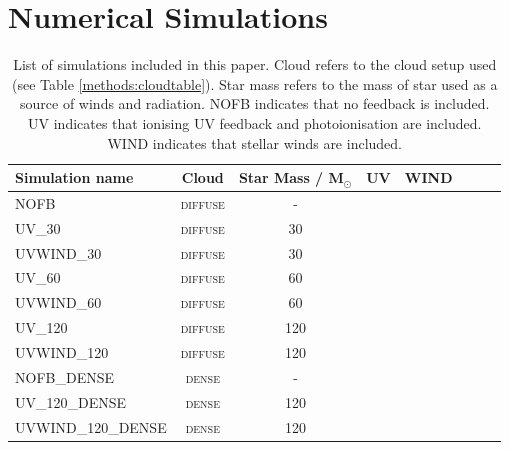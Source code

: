 \documentclass[a4paper,fleqn,usenatbib]{mnras}
\newcommand{\Msolar}{M$_{\odot}$\xspace}
\newcommand{\tick}{\hspace{1pt}\ding{51}}
\newcommand{\cross}{\hspace{1pt}\ding{55}}
\begin{document}
\section{Numerical Simulations}
\label{methods}

\begin{table}
	\centering
	\caption{List of simulations included in this paper. Cloud refers to the cloud setup used (see Table \ref{methods:cloudtable}). Star mass refers to the mass of star used as a source of winds and radiation. NOFB indicates that no feedback is included. UV indicates that ionising UV feedback and photoionisation are included. WIND indicates that stellar winds are included.}
	\label{methods:simtable}
	\begin{tabular}{lccccccc} %
		\hline
		Simulation name     & Cloud             & Star Mass / \Msolar & UV     & WIND \\
		\hline
		\hline
		NOFB                & \textsc{diffuse}  & -                   & \cross & \cross \\
		\hline
		UV\_30              & \textsc{diffuse}  & 30                  & \tick  & \cross \\
		UVWIND\_30          & \textsc{diffuse}  & 30                  & \tick  & \tick  \\
		\hline
		UV\_60              & \textsc{diffuse}  & 60                  & \tick  & \cross \\
		UVWIND\_60          & \textsc{diffuse}  & 60                  & \tick  & \tick  \\
		\hline
		UV\_120             & \textsc{diffuse}  & 120                 & \tick  & \cross \\
		UVWIND\_120         & \textsc{diffuse}  & 120                 & \tick  & \tick  \\
		\hline
		NOFB\_DENSE         & \textsc{dense}    & -                   & \cross & \cross \\
		\hline
		UV\_120\_DENSE      & \textsc{dense}    & 120                 & \tick  & \cross \\
		UVWIND\_120\_DENSE  & \textsc{dense}    & 120                 & \tick  & \tick  \\
		\hline
	\end{tabular}
\end{table}
\end{document}
